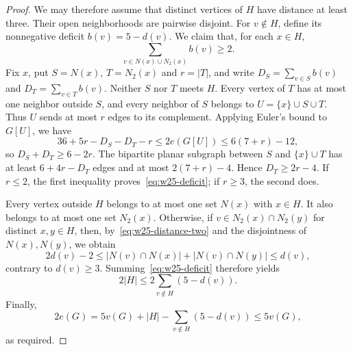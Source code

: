 \documentclass[11pt,a4paper]{article}
\theoremstyle{remark}
\begin{document}
\begin{proof}
We may therefore assume that distinct vertices of $H$ have distance at least three. Their open neighborhoods are pairwise disjoint. For $v\notin H$, define its nonnegative deficit $b(v)=5-d(v)$. We claim that, for each $x\in H$,
\begin{equation}\label{eq:w25-deficit}
\sum_{v\in N(x)\cup N_2(x)}b(v)\ge2.
\end{equation}
Fix $x$, put $S=N(x)$, $T=N_2(x)$ and $r=|T|$, and write $D_S=\sum_{v\in S}b(v)$ and $D_T=\sum_{v\in T}b(v)$. Neither $S$ nor $T$ meets $H$. Every vertex of $T$ has at most one neighbor outside $S$, and every neighbor of $S$ belongs to $U=\{x\}\cup S\cup T$. Thus $U$ sends at most $r$ edges to its complement. Applying Euler's bound to $G[U]$, we have
\[
36+5r-D_S-D_T-r
\le2e(G[U])\le6(7+r)-12,
\]
so $D_S+D_T\ge6-2r$. The bipartite planar subgraph between $S$ and $\{x\}\cup T$ has at least $6+4r-D_T$ edges and at most $2(7+r)-4$. Hence $D_T\ge2r-4$. If $r\le2$, the first inequality proves~\eqref{eq:w25-deficit}; if $r\ge3$, the second does.

Every vertex outside $H$ belongs to at most one set $N(x)$ with $x\in H$. It also belongs to at most one set $N_2(x)$. Otherwise, if $v\in N_2(x)\cap N_2(y)$ for distinct $x,y\in H$, then, by~\eqref{eq:w25-distance-two} and the disjointness of $N(x),N(y)$, we obtain
\[
2d(v)-2\le
|N(v)\cap N(x)|+|N(v)\cap N(y)|\le d(v),
\]
contrary to $d(v)\ge3$. Summing~\eqref{eq:w25-deficit} therefore yields
\[
2|H|\le2\sum_{v\notin H}(5-d(v)).
\]
Finally,
\[
2e(G)=5v(G)+|H|-\sum_{v\notin H}(5-d(v))\le5v(G),
\]
as required.
\end{proof}
\end{document}
